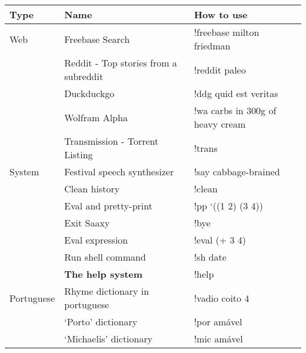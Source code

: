 \documentclass[11pt]{article}
\begin{document}
\begin{center}
\begin{tabular}{lll}
 Type          &  Name                                   &  How to use                                         \\
\hline
 Web           &  Freebase Search                        &  !freebase milton friedman                          \\
               &  Reddit - Top stories from a subreddit  &  !reddit paleo                                      \\
               &  Duckduckgo                             &  !ddg quid est veritas                              \\
               &  Wolfram Alpha                          &  !wa carbs in 300g of heavy cream                   \\
               &  Transmission - Torrent Listing         &  !trans                                             \\
\hline
 System        &  Festival speech synthesizer            &  !say cabbage-brained                               \\
               &  Clean history                          &  !clean                                             \\
               &  Eval and pretty-print                  &  !pp `((1 2) (3 4))                                 \\
               &  Exit Saaxy                             &  !bye                                               \\
               &  Eval expression                        &  !eval (+ 3 4)                                      \\
               &  Run shell command                      &  !sh date                                           \\
               &  \textbf{The help system}               &  !help                                              \\
\hline
 Portuguese    &  Rhyme dictionary in portuguese         &  !vadio coito 4                                     \\
               &  `Porto' dictionary                     &  !por amável                                        \\
               &  `Michaelis' dictionary                 &  !mic amável                                        \\

\end{tabular}
\end{center}
\end{document}
